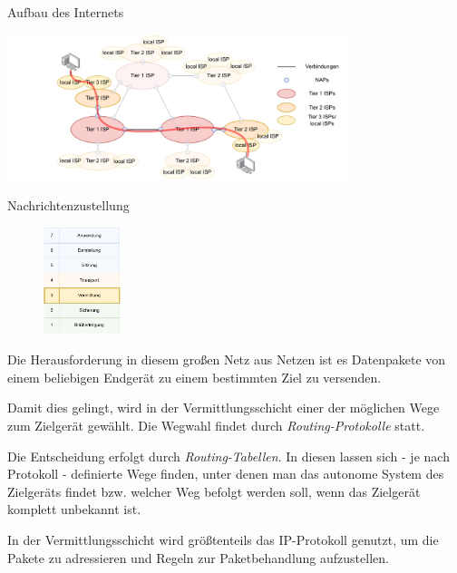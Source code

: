 \begin{bonus}{Aufbau des Internets}
    \begin{center}
        \includegraphics[width=0.75\textwidth]{includes/figures/bonus_aufbau_internet_4.pdf}
    \end{center}
\end{bonus}

\begin{bonus}{Nachrichtenzustellung}
    \begin{figure}
        \begin{center}
            \includegraphics[width=0.2\textwidth]{includes/figures/bonus_iso_osi_vermittlung.pdf}
        \end{center}
    \end{figure}
    Die Herausforderung in diesem großen Netz aus Netzen ist es Datenpakete von einem beliebigen Endgerät zu einem bestimmten Ziel zu versenden.
    
    Damit dies gelingt, wird in der Vermittlungsschicht einer der möglichen Wege zum Zielgerät gewählt.
    Die Wegwahl findet durch \emph{Routing-Protokolle} statt.
    
    Die Entscheidung erfolgt durch \emph{Routing-Tabellen}.
    In diesen lassen sich - je nach Protokoll - definierte Wege finden, unter denen man das autonome System des Zielgeräts findet bzw. welcher Weg befolgt werden soll, wenn das Zielgerät komplett unbekannt ist.
    
    In der Vermittlungsschicht wird größtenteils das IP-Protokoll genutzt, um die Pakete zu adressieren und Regeln zur Paketbehandlung aufzustellen.
\end{bonus}

